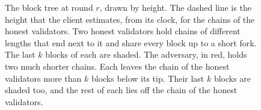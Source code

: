 \begin{figure}[!t]
\caption{The block tree at round $r$, drawn by height. The dashed line is the
height that the client estimates, from its clock, for the chains of the honest
validators. Two honest validators hold chains of different lengths that end
next to it and share every block up to a short fork. The last $k$ blocks of
each are shaded. The adversary, in red, holds two much shorter chains. Each
leaves the chain of the honest validators more than $k$ blocks below its tip.
Their last $k$ blocks are shaded too, and the rest of each lies off the chain
of the honest validators.}\label{fig.tree}
\end{figure}
